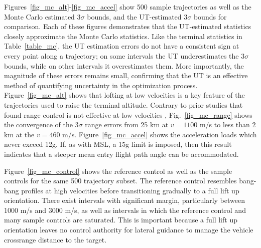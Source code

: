 \documentclass[journal ]{new-aiaa}
\begin{document}
Figures~\ref{fig_mc_alt}-\ref{fig_mc_accel} show 500 sample trajectories as well as the Monte Carlo estimated 3$\sigma$ bounds, and the UT-estimated 3$\sigma$ bounds for comparison. Each of these figures demonstrates that the UT-estimated statistics closely approximate the Monte Carlo statistics. Like the terminal statistics in Table~\ref{table_mc}, the UT estimation errors do not have a consistent sign at every point along a trajectory; on some intervals the UT underestimates the 3$\sigma$ bounds, while on other intervals it overestimates them. More importantly, the magnitude of these errors remains small, confirming that the UT is an effective method of quantifying uncertainty in the optimization process. 
Figure~\ref{fig_mc_alt} shows that lofting at low velocities is a key feature of the trajectories used to raise the terminal altitude. Contrary to prior studies that found range control is not effective at low velocities \cite{MSL_EDL2}, Fig.~\ref{fig_mc_range} shows the convergence of the 3$\sigma$ range errors from 25 km at $ v=1100 $ m/s to less than 2 km at the $v=460$ m/s. 
Figure~\ref{fig_mc_accel} shows the acceleration loads which never exceed 12g. If, as with MSL, a 15g limit is imposed, then this result indicates that a steeper mean entry flight path angle can be accommodated.

Figure~\ref{fig_mc_control} shows the reference control as well as the sample controls for the same 500 trajectory subset. The reference control resembles bang-bang profiles at high velocities before transitioning gradually to a full lift up orientation. There exist intervals with significant margin, particularly between 1000 m/s and 3000 m/s, as well as intervals in which the reference control and many sample controls are saturated. 
This is important because a full lift up orientation leaves no control authority for lateral guidance to manage the vehicle crossrange distance to the target.
\end{document}
